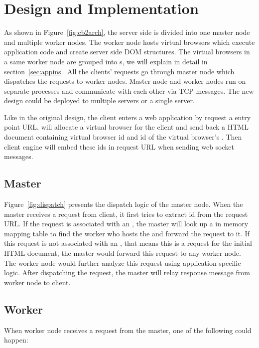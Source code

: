 \section{Design and Implementation}
\label{sec:implementation}
As shown in Figure~\ref{fig:cb2arch}, the server side is divided into one master node and multiple worker nodes.
The worker node hosts virtual browsers which execute application code and create server
side DOM structures.
The virtual browsers in a same worker node are grouped into \appins{}s,
we will explain \appins{} in detail in section~\ref{sec:appins}.
All the clients' requests go through master node which dispatches the requests to 
worker nodes.
Master node and worker nodes run on separate processes and communicate with each other
via TCP messages.
The new design could be deployed to multiple servers or a single server.

Like in the original design,
the client enters a web application by request a entry point URL.
\cb{} will allocate a virtual browser for the client and send back 
a HTML document containing virtual browser id and id of the virtual browser's \appins{}.
Then client engine will embed these ids in request URL when sending 
web socket messages.


\newarchitectureoverview{}




\subsection{Master}
Figure~\ref{fig:dispatch} presents the dispatch logic of the master node.
When the master receives a request from client,
it first tries to extract \appins{} id from the request URL.
If the request is associated with an \appins{}, 
the master will look up a in memory mapping table to find the worker
who hosts the \appins{} and forward the request to it.
If this request is not associated with an \appins{}, 
that means this is a request for the initial HTML document,
the master would forward this request to any worker node.
The worker node would further analyze this request using application specific logic.
After dispatching the request, 
the master will relay response message from worker node to client.



\requestdispatchdiagram{}


\subsection{Worker}
\label{sec:worker}
When worker node receives a request from the master, 
one of the following could happen:

